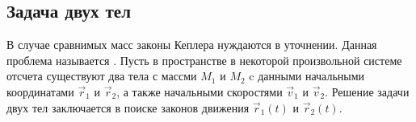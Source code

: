 \subsection{Задача двух тел}
\label{sec:two-body-problem}
В случае сравнимых масс законы Кеплера нуждаются в уточнении. Данная проблема называется . Пусть в пространстве в некоторой произвольной системе отсчета существуют два тела с массми $M_1$ и $M_2$ c данными начальными координатами $\vec{r}_1$ и $\vec{r}_2$, а также начальными скоростями $\vec{v}_1$ и $\vec{v}_2$. Решение задачи двух тел заключается в поиске законов движения $\vec{r}_1(t)$ и $\vec{r}_2(t)$.

\begin{figure}
    \centering
    \vspace{-1pc}
    \caption{}
    \label{pic:reduced-mass}    
\end{figure}

